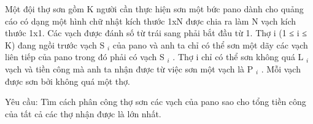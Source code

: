 Một đội thợ sơn gồm K người cần thực hiện sơn một bức pano dành cho quảng cáo có dạng một hình chữ nhật kích thước 1xN được chia ra làm N vạch kích thước 1x1. Các vạch được đánh số từ trái   sang phải bắt đầu từ 1. Thợ i (1 ≤ i ≤ K) đang ngồi trước vạch S   $_    i   $   của pano và anh ta chỉ có thể sơn một dãy các vạch liên tiếp của pano trong đó phải có vạch S   $_    i   $   . Thợ i chỉ có thể   sơn không quá L   $_    i   $   vạch và tiền công mà anh ta nhận được từ việc sơn một vạch là P   $_    i   $   . Mỗi vạch được sơn bởi không quá một thợ.  

   Yêu cầu: Tìm cách phân công thợ sơn các vạch của pano sao cho tổng tiền công của tất cả các thợ nhận được là lớn nhất.